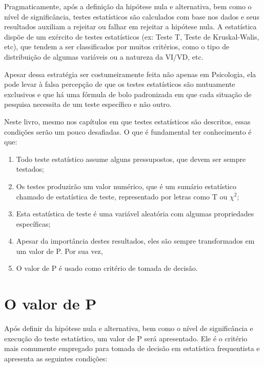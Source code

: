 \documentclass[
]{book}
\providecommand{\tightlist}{%
  \setlength{\itemsep}{0pt}\setlength{\parskip}{0pt}}
\begin{document}
Pragmaticamente, após a definição da hipótese nula e alternativa, bem
como o nível de significância, testes estatísticos são calculados com
base nos dados e seus resultados auxiliam a rejeitar ou falhar em
rejeitar a hipótese nula. A estatística dispõe de um exército de testes
estatísticos (ex: Teste T, Teste de Kruskal-Walis, etc), que tendem a
ser classificados por muitos critérios, como o tipo de distribuição de
algumas variáveis ou a natureza da VI/VD, etc.

Apesar dessa estratégia ser costumeiramente feita não apenas em
Psicologia, ela pode levar à falsa percepção de que os testes
estatísticos são mutuamente exclusivos e que há uma fórmula de bolo
padronizada em que cada situação de pesquisa necessita de um teste
específico e não outro.

Neste livro, mesmo nos capítulos em que testes estatísticos são
descritos, essas condições serão um pouco desafiadas. O que é
fundamental ter conhecimento é que:

\begin{enumerate}
\def\labelenumi{(\arabic{enumi})}
\tightlist
\item
  Todo teste estatístico assume alguns pressupostos, que devem ser
  sempre testados;\\
\item
  Os testes produzirão um valor numérico, que é um sumário estatístico
  chamado de estatística de teste, representado por letras como T ou
  \(\chi^2\);\\
\item
  Esta estatística de teste é uma variável aleatória com algumas
  propriedades específicas;\\
\item
  Apesar da importância destes resultados, eles são sempre transformados
  em um valor de P. Por sua vez,\\
\item
  O valor de P é usado como critério de tomada de decisão.
\end{enumerate}

\hypertarget{o-valor-de-p}{%
\section{O valor de P}\label{o-valor-de-p}}

Após definir da hipótese nula e alternativa, bem como o nível de
significância e execução do teste estatístico, um valor de P será
apresentado. Ele é o critério mais comumente empregado para tomada de
decisão em estatística frequentista e apresenta as seguintes condições:
\end{document}
